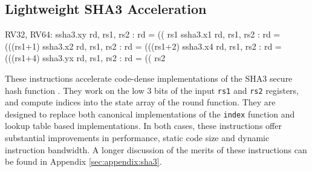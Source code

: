 

\subsection{Lightweight SHA3 Acceleration}
\label{sec:scalar:sha3}

\begin{cryptoisa}
RV32, RV64:
    ssha3.xy rd, rs1, rs2 : rd = (( rs1    %
    ssha3.x1 rd, rs1, rs2 : rd = (((rs1+1) %
    ssha3.x2 rd, rs1, rs2 : rd = (((rs1+2) %
    ssha3.x4 rd, rs1, rs2 : rd = (((rs1+4) %
    ssha3.yx rd, rs1, rs2 : rd = (( rs2    %
\end{cryptoisa}

These instructions accelerate code-dense implementations of the SHA3 secure
hash function \cite{nist:fips:202}.
They work on the low $3$ bits of the input {\tt rs1} and {\tt rs2} registers,
and compute indices into the state array of the round function.
They are designed to replace both canonical implementations of the
{\tt index} function and lookup table based implementations.
In both cases, these instructions offer substantial
improvements in performance, static code size and dynamic instruction
bandwidth.
A longer discussion of the merits of these instructions can
be found in Appendix \ref{sec:appendix:sha3}.



